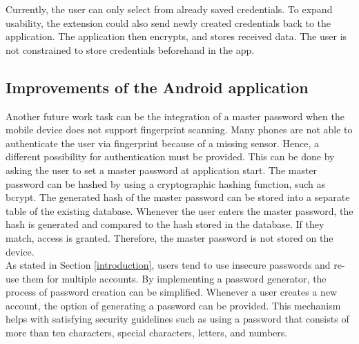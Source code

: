 Currently, the user can only select from already saved credentials. To expand usability, the extension could also send newly created credentials back to the application. The application then encrypts, and stores received data. The user is not constrained to store credentials beforehand in the app. 

\subsection{Improvements of the Android application}
Another future work task can be the integration of a master password when the mobile device does not support fingerprint scanning. Many phones are not able to authenticate the user via fingerprint because of a missing sensor. Hence, a different possibility for authentication must be provided. This can be done by asking the user to set a master password at application start. The master password can be hashed by using a cryptographic hashing function, such as bcrypt. The generated hash of the master password can be stored into a separate table of the existing database. Whenever the user enters the master password, the hash is generated and compared to the hash stored in the database. If they match, access is granted. Therefore, the master password is not stored on the device. \\

As stated in Section \ref{introduction}, users tend to use insecure passwords and re-use them for multiple accounts. By implementing a password generator, the process of password creation can be simplified. Whenever a user creates a new account, the option of generating a password can be provided. This mechanism helps with satisfying security guidelines such as using a password that consists of more than ten characters, special characters, letters, and numbers.

